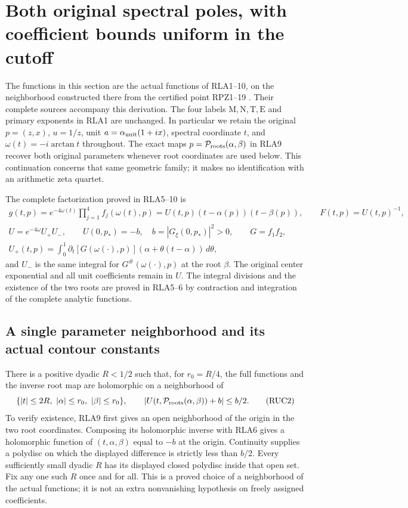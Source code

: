 \section{Both original spectral poles, with coefficient bounds uniform in the cutoff}
\label{sec:real-pair-uniform-coefficients}

The functions in this section are the actual functions of RLA1--10,
on the neighborhood constructed there from the certified point
RPZ1--19 \cite{RPZ005}.  Their complete sources accompany this
derivation.  The four labels $\mathrm M,\mathrm N,\mathrm T,\mathrm E$
and primary exponents in RLA1 are unchanged.  In particular we retain
the original $p=(z,x)$, $u=1/z$, unit
$a=\alpha_{\rm unit}(1+ix)$, spectral coordinate $t$, and
$\omega(t)=-i\arctan t$ throughout.  The exact maps
$p=\mathcal P_{\rm roots}(\alpha,\beta)$ in RLA9 recover both
original parameters whenever root coordinates are used below.
This continuation concerns that same geometric family; it makes no
identification with an arithmetic zeta quartet.

The complete factorization proved in RLA5--10 is
\[
 \begin{gathered}
 g(t,p)=e^{-4\omega(t)}\prod_{j=1}^4 f_j(\omega(t),p)
       =U(t,p)(t-\alpha(p))(t-\beta(p)),\qquad F(t,p)=U(t,p)^{-1},\\
 U=e^{-4\omega}U_+U_-,\qquad U(0,p_*)=-b,\quad
 b=|G_\xi(0,p_*)|^2>0,\qquad G=f_1f_2,\\
 U_+(t,p)=\int_0^1\partial_t[G(\omega(\cdot),p)]
        (\alpha+\theta(t-\alpha))\,d\theta,
 \end{gathered}\tag{RUC1}
\]
and $U_-$ is the same integral for $G^\#(\omega(\cdot),p)$ at
the root $\beta$.  The original center exponential and all unit
coefficients remain in $U$.  The integral divisions and the
existence of the two roots are proved in RLA5--6 by contraction
and integration of the complete analytic functions.

\subsection{A single parameter neighborhood and its actual contour constants}

There is a positive dyadic $R<1/2$ such that, for
$r_0=R/4$, the full functions and the inverse root map are
holomorphic on a neighborhood of
\[
 \{|t|\le2R,\ |\alpha|\le r_0,\ |\beta|\le r_0\},\qquad
 |U(t,\mathcal P_{\rm roots}(\alpha,\beta))+b|\le b/2.
 \tag{RUC2}
\]
To verify existence, RLA9 first gives an open neighborhood of the
origin in the two root coordinates.  Composing its holomorphic
inverse with RLA6 gives a holomorphic function of $(t,\alpha,\beta)$
equal to $-b$ at the origin.  Continuity supplies a polydisc on
which the displayed difference is strictly less than $b/2$.
Every sufficiently small dyadic $R$ has its displayed closed
polydisc inside that open set.  Fix any one such $R$ once and
for all.  This is a proved choice of a neighborhood of the actual
functions; it is not an extra nonvanishing hypothesis on freely
assigned coefficients.

